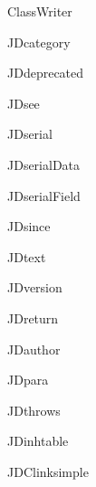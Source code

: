 \begin{jdclass}[class]{ClassWriter}
\begin{jdfield}{JDcategory}
\end{jdfield}
\begin{jdfield}{JDdeprecated}
\jdprivate \jdfinal \jdstatic 
{}
\end{jdfield}
\begin{jdfield}{JDsee}
\jdprivate \jdfinal \jdstatic 
{}
\end{jdfield}
\begin{jdfield}{JDserial}
\jdprivate \jdfinal \jdstatic 
{}
\end{jdfield}
\begin{jdfield}{JDserialData}
\jdprivate \jdfinal \jdstatic 
{}
\end{jdfield}
\begin{jdfield}{JDserialField}
\jdprivate \jdfinal \jdstatic 
{}
\end{jdfield}
\begin{jdfield}{JDsince}
\jdprivate \jdfinal \jdstatic 
{}
\end{jdfield}
\begin{jdfield}{JDtext}
\jdprivate \jdfinal \jdstatic 
{}
\end{jdfield}
\begin{jdfield}{JDversion}
\jdprivate \jdfinal \jdstatic 
{}
\end{jdfield}
\begin{jdfield}{JDreturn}
\jdprivate \jdfinal \jdstatic 
{}
\end{jdfield}
\begin{jdfield}{JDauthor}
\jdprivate \jdfinal \jdstatic 
{}
\end{jdfield}
\begin{jdfield}{JDpara}
\jdprivate \jdfinal \jdstatic 
{}
\end{jdfield}
\begin{jdfield}{JDthrows}
\jdprivate \jdfinal \jdstatic 
{}
\end{jdfield}
\begin{jdfield}{JDinhtable}
\jdprivate \jdfinal \jdstatic 
{}
\end{jdfield}
\begin{jdfield}{JDClinksimple}
\jdprivate \jdfinal \jdstatic 
{}
\end{jdfield}

\end{jdclass}
